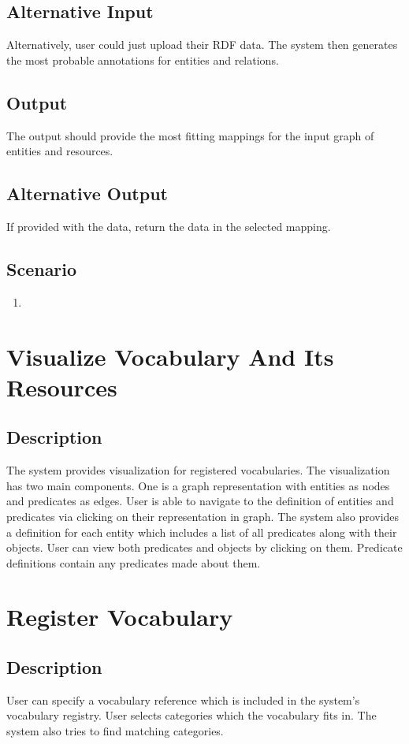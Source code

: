 \subsection{Alternative Input}
Alternatively, user could just upload their RDF data. The system then generates the most probable annotations for entities and relations.

\subsection{Output}
The output should provide the most fitting mappings for the input graph of entities and resources.

\subsection{Alternative Output}
If provided with the data, return the data in the selected mapping.

\subsection{Scenario}
\begin{enumerate}
    \item 
\end{enumerate}


\section{Visualize Vocabulary And Its Resources}
\subsection{Description}
The system provides visualization for registered vocabularies. The visualization has two main components. One is a graph representation with entities as nodes and predicates as edges. User is able to navigate to the definition of entities and predicates via clicking on their representation in graph. The system also provides a definition for each entity which includes a list of all predicates along with their objects. User can view both predicates and objects by clicking on them. Predicate definitions contain any predicates made about them.

\section{Register Vocabulary}
\subsection{Description}
User can specify a vocabulary reference which is included in the system's vocabulary registry. User selects categories which the vocabulary fits in. The system also tries to find matching categories.


